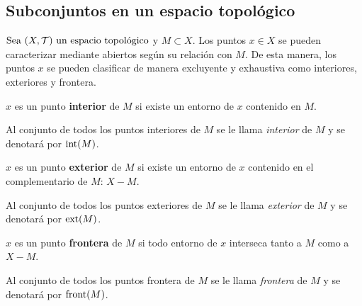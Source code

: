 \subsection*{Subconjuntos en un espacio topológico}

$\seatop$ y $M\subset X$. Los puntos $x\in X$ se pueden caracterizar mediante abiertos según su relación con $M$. De esta manera, los puntos $x$ se pueden clasificar de manera excluyente y exhaustiva como interiores, exteriores y frontera.

\begin{deff}
    $x$ es un punto \textbf{interior} de $M$ si existe un entorno de $x$ contenido en $M$.
\end{deff}
Al conjunto de todos los puntos interiores de $M$ se le llama \textit{interior} de $M$ y se denotará por \underline{$\interior{M}$}.

\begin{deff}
    $x$ es un punto \textbf{exterior} de $M$ si existe un entorno de $x$ contenido en el complementario de $M$: $X - M$.
\end{deff}
Al conjunto de todos los puntos exteriores de $M$ se le llama \textit{exterior} de $M$ y se denotará por \underline{$\exterior{M}$}.

\begin{deff}
    $x$ es un punto \textbf{frontera} de $M$ si todo entorno de $x$ interseca tanto a $M$ como a $X - M$.
\end{deff}
Al conjunto de todos los puntos frontera de $M$ se le llama \textit{frontera} de $M$ y se denotará por \underline{$\frontera{M}$}.

